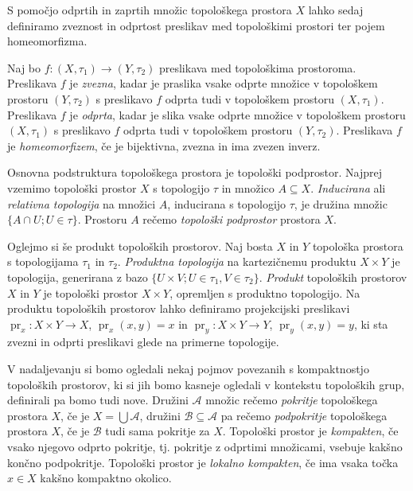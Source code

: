 \documentclass[mat1]{fmfdelo}
\DeclareMathOperator{\pr}{pr}
\begin{document}
S pomočjo odprtih in zaprtih množic topološkega prostora $X$ lahko sedaj de\-fi\-ni\-ra\-mo zveznost in odprtost preslikav med topološkimi prostori ter pojem ho\-me\-o\-mor\-fiz\-ma.

Naj bo $f\colon (X, \tau_1) \to (Y, \tau_2)$ preslikava med topološkima prostoroma.
Preslikava $f$ je \emph{zvezna}, kadar je praslika vsake odprte množice v topološkem prostoru $(Y, \tau_2)$ s preslikavo $f$ odprta tudi v topološkem prostoru $(X, \tau_1)$.
Preslikava $f$ je \emph{odprta}, kadar je slika vsake odprte množice v topološkem prostoru $(X, \tau_1)$ s preslikavo $f$ odprta tudi v topološkem prostoru $(Y, \tau_2)$.
Preslikava $f$ je \emph{homeomorfizem}, če je bijektivna, zvezna in ima zvezen inverz.

Osnovna podstruktura topološkega prostora je topološki podprostor.
Najprej vzemimo topološki prostor $X$ s topologijo $\tau$ in množico $A \subseteq X$. \emph{Inducirana} ali \emph{relativna topologija} na množici $A$, inducirana s topologijo $\tau$, je družina množic $\lbrace A \cap U ; U \in \tau \rbrace$. Prostoru $A$ rečemo \emph{topološki podprostor} prostora $X$.

Oglejmo si še produkt topoloških prostorov.
Naj bosta $X$ in $Y$ topološka prostora s topologijama $\tau_1$ in $\tau_2$. \emph{Produktna topologija} na kartezičnemu produktu $X \times Y$ je topologija, generirana z bazo $\lbrace U \times V ; U \in \tau_1, V \in \tau_2 \rbrace$. \emph{Produkt} topoloških prostorov $X$ in $Y$ je topološki prostor $X \times Y$, opremljen s produktno topologijo. Na produktu topoloških prostorov lahko definiramo projekcijski preslikavi $\pr_x\colon X \times Y \to X$, $\pr_x(x, y) = x$ in $\pr_y\colon X \times Y \to Y$, $\pr_y(x, y) = y$, ki sta zvezni in odprti preslikavi glede na primerne topologije.

V nadaljevanju si bomo ogledali nekaj pojmov povezanih s kompaktnostjo to\-po\-loš\-kih prostorov, ki si jih bomo kasneje ogledali v kontekstu topoloških grup, definirali pa bomo tudi nove.
Družini $\mathcal{A}$ množic rečemo \emph{pokritje} topološkega prostora $X$, če je $X = \bigcup \mathcal{A}$, družini $\mathcal{B} \subseteq \mathcal{A}$ pa rečemo \emph{podpokritje} topološkega prostora $X$, če je $\mathcal{B}$ tudi sama pokritje za $X$.
Topološki prostor je \emph{kompakten}, če vsako njegovo odprto pokritje, tj. pokritje z odprtimi množicami, vsebuje kakšno končno podpokritje.
Topološki prostor je \emph{lokalno kompakten}, če ima vsaka točka $x \in X$ kakšno kompaktno okolico.
\end{document}

